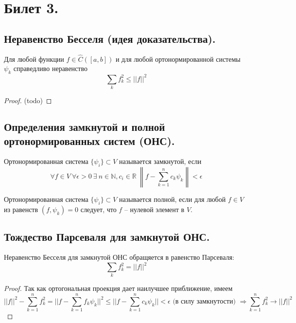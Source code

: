 \section{Билет 3.}

\subsection{Неравенство Бесселя (идея доказательства).}
\begin{theorem}
    Для любой функции $f \in \hat{C}([a,b])$ и для любой ортонормированной системы ${\psi_k}$ справедливо неравенство
    \[
        \sum_{k} f_k^2 \leqslant ||f||^2
    \]
    \begin{proof}
        (todo)
    \end{proof}
\end{theorem}

\subsection{Определения замкнутой и полной ортонормированных систем (ОНС).}
\begin{definition}
    Ортонормированная система $\{\psi_i\} \subset V$ называется замкнутой, если
    \[
        \forall f \in V \>
        \forall \epsilon > 0 \>
        \exists \> n \in \mathbb{N}, c_i \in \mathbb{R} \>
        \left\lVert
            f - \sum_{k=1}^n c_k \psi_k
        \right\rVert < \epsilon
    \]
\end{definition}
\begin{definition}
    Ортонормированная система $\{\psi_i\} \subset V$  называется полной, если для любой $f \in V$ из равенств  $(f, \psi_k) = 0$ следует, что $f$ -- нулевой элемент в $V$.
\end{definition}

\subsection{Тождество Парсеваля для замкнутой ОНС.}
\begin{theorem}
    Неравенство Бесселя для замкнутой ОНС обращяется в равенство Парсеваля:
    \[
        \sum_{k} f_k^2 = ||f||^2
    \]
    \begin{proof}
        Так как ортогональная проекция дает наилучшее приближение, имеем
        \[
            ||f||^2 - \sum_{k=1}^n f_k^2 = ||f - \sum_{k=1}^n f_k \psi_k||^2 \leqslant ||f - \sum_{k=1}^n c_k \psi_k|| < \epsilon \text{ (в силу замкнутости) }
            \Rightarrow
            \sum_{k=1}^n f_k^2 \to ||f||^2
        \]
    \end{proof}
\end{theorem}